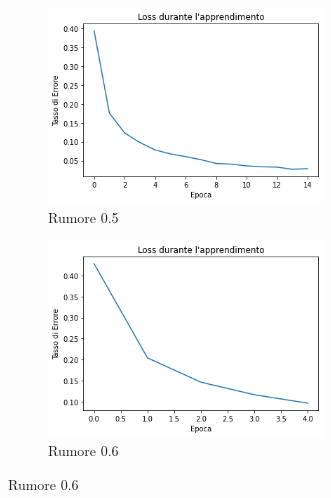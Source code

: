 \documentclass[12pt, a4paper]{article}
\begin{document}
\begin{figure}[H]
    \begin{subfigure}{0.5\textwidth}
        \centering
        \caption{Rumore 0.5}
        \includegraphics[width=0.80\textwidth]{Rumore5.png}
    \end{subfigure}    
    \begin{subfigure}{0.5\textwidth}
        \centering
        \caption{Rumore 0.6}
        \includegraphics[width=0.80\textwidth]{Rumore6.png}
    \end{subfigure}  
\end{figure}
\end{document}
